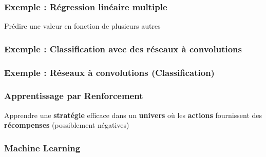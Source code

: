 \begin{frame}
  \frametitle{Exemple : Régression linéaire multiple}
  Prédire une valeur en fonction de plusieurs autres

\end{frame}

\begin{frame}
  \frametitle{Exemple : Classification avec des réseaux à convolutions}
  
\end{frame}

\begin{frame}
  \frametitle{Exemple : Réseaux à convolutions (Classification)}
\end{frame}

\begin{frame}
  \frametitle{Apprentissage par Renforcement}
  Apprendre une \textbf{stratégie} efficace dans un \textbf{univers} où les \textbf{actions} fournissent des \textbf{récompenses} (possiblement négatives)
  \vfill
  \begin{minipage}[l]{0.39\linewidth}
  \end{minipage}
  \begin{minipage}[l]{0.59\linewidth}
  \end{minipage}
\end{frame}

\begin{frame}
  \frametitle{Machine Learning}
\end{frame}
